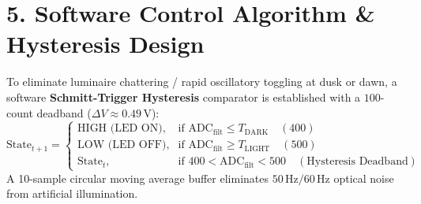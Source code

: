 \documentclass[10pt,a4paper]{article}
\begin{document}
\newpage

\section*{5. Software Control Algorithm \& Hysteresis Design}
To eliminate luminaire chattering / rapid oscillatory toggling at dusk or dawn, a software \textbf{Schmitt-Trigger Hysteresis} comparator is established with a $100$-count deadband ($\Delta V \approx 0.49\,\text{V}$):
\begin{equation}
\text{State}_{t+1} = 
\begin{cases} 
\text{HIGH (LED ON)}, & \text{if } \text{ADC}_{\text{filt}} \le T_{\text{DARK}} \quad (400) \\
\text{LOW (LED OFF)}, & \text{if } \text{ADC}_{\text{filt}} \ge T_{\text{LIGHT}} \quad (500) \\
\text{State}_t, & \text{if } 400 < \text{ADC}_{\text{filt}} < 500 \quad (\text{Hysteresis Deadband})
\end{cases}
\end{equation}
A 10-sample circular moving average buffer eliminates $50\,\text{Hz}/60\,\text{Hz}$ optical noise from artificial illumination.
\end{document}
